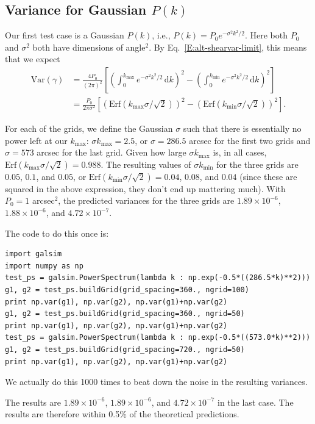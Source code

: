 \documentclass[preprint]{aastex}
\newcommand{\kmax}{\ensuremath{k_\mathrm{max}}}
\newcommand{\kmin}{\ensuremath{k_\mathrm{min}}}
\newcommand{\rmd}{\ensuremath{\mathrm{d}}}
\begin{document}
\subsection{Variance for Gaussian $P(k)$}

Our first test case is a Gaussian $P(k)$, i.e., $P(k) =
P_0 e^{-\sigma^2 k^2 / 2}$.  Here both $P_0$ and $\sigma^2$ both
have dimensions of angle$^2$.  By Eq.~\eqref{E:alt-shearvar-limit}, this
means that we expect
\begin{align}
\mathrm{Var}(\gamma) &= \frac{4P_0}{(2\pi)^2} \left[\left(\int_{0}^{\kmax} 
e^{-\sigma^2 k^2/2} \,\rmd k\right)^2 - \left(\int_{0}^{\kmin} 
e^{-\sigma^2 k^2/2} \,\rmd k\right)^2\right] \\
 &= \frac{P_0}{2\pi\sigma^2}\left[ \left(\mathrm{Erf}(\kmax\sigma/\sqrt{2})\right)^2 - \left(\mathrm{Erf}(\kmin\sigma/\sqrt{2})\right)^2\right].\label{E:vargauss}
\end{align}

For each of the grids, we define the Gaussian $\sigma$ such that there
is essentially no power left at our \kmax: $\sigma\kmax=2.5$, or
$\sigma=286.5$ arcsec for the first two grids and $\sigma=573$ arcsec
for the last grid.  Given how large $\sigma\kmax$ is, in all cases,
$\mathrm{Erf}(\kmax\sigma/\sqrt{2})=0.988$.  The resulting values of
$\sigma\kmin$ for the three grids are $0.05$, $0.1$, and $0.05$, or
$\mathrm{Erf}(\kmin\sigma/\sqrt{2})=0.04$, $0.08$, and $0.04$ (since
these are squared in the above expression, they don't end up mattering
much).  With
$P_0=1$ arcsec$^2$, the predicted variances for the three grids are
$1.89\times 10^{-6}$, $1.88\times 10^{-6}$, and $4.72\times 10^{-7}$.

The code to do this once is:
\begin{verbatim}
import galsim
import numpy as np
test_ps = galsim.PowerSpectrum(lambda k : np.exp(-0.5*((286.5*k)**2)))
g1, g2 = test_ps.buildGrid(grid_spacing=360., ngrid=100)
print np.var(g1), np.var(g2), np.var(g1)+np.var(g2)
g1, g2 = test_ps.buildGrid(grid_spacing=360., ngrid=50)
print np.var(g1), np.var(g2), np.var(g1)+np.var(g2)
test_ps = galsim.PowerSpectrum(lambda k : np.exp(-0.5*((573.0*k)**2)))
g1, g2 = test_ps.buildGrid(grid_spacing=720., ngrid=50)
print np.var(g1), np.var(g2), np.var(g1)+np.var(g2)
\end{verbatim}
We actually do this 1000 times to beat down the noise in the resulting
variances.

The results are $1.89\times 10^{-6}$, $1.89\times 10^{-6}$, and
$4.72\times 10^{-7}$ in the last case.  The results are therefore
within 0.5\% of the theoretical predictions.
\end{document}
